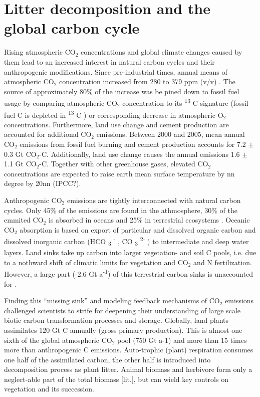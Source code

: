 \section{Litter decomposition and the global carbon cycle}

Rising atmospheric CO$_{2}$ concentrations and global climate changes caused by them \citep{IPCC2007pt1ch1} lead to an increased interest in natural carbon cycles and their anthropogenic modifications. Since pre-industrial times, annual means of atmospheric CO$_{2}$ concentration increased from 280 to 379 ppm (v/v) \citep{IPCC2007pt1ch1}. The source of approximately 80\% of the increase was be pined down to fossil fuel usage by comparing atmospheric CO$_{2}$ concentration to its \textsuperscript{13} C signature (fossil fuel C is depleted in \textsuperscript{13} C ) or corresponding decrease in atmospheric O$_{2}$ concentrations\citep{IPCC2007pt1ch1}. Furthermore, land use change and cement production are accounted for additional CO$_{2}$ emissions. Between 2000 and 2005, mean annual CO$_{2}$ emissions from fossil fuel burning and cement production accounts for 7.2 $\pm$ 0.3 Gt CO$_{2}$-C. Additionally, land use change causes the annual emissions 1.6 $\pm$ 1.1 Gt CO$_{2}$-C. Together with other greenhouse gases, elevated CO$_{2}$ concentrations are expected to raise earth mean surface temperature by nn degree by 20nn (IPCC?).

Anthropogenic CO$_{2}$ emissions are tightly interconnected with natural carbon cycles. Only 45\% of the emissions are found in the athmosphere, 30\% of the emmited CO$_{2}$ is absorbed in oceans and 25\% in terrestrial ecosystems . Oceanic CO$_{2}$ absorption is based on export of particular and dissolved organic carbon and dissolved inorganic carbon (HCO \textsubscript{3} \textsuperscript{-} , CO \textsubscript{3} \textsuperscript{2-} ) to intermediate and deep water layers. Land sinks take up carbon into larger vegetation- and soil C pools, i.e. due to a nothward shift of climatic limits for vegetation and CO$_{2}$ and N fertilization. However, a large part (-2.6 Gt a\textsuperscript{-1}) of this terrestrial carbon sinks is unaccounted for \citep[p. 515]{IPCC2007pt1ch7}. 

Finding this ``missing sink'' and modeling feedback mechanisms of CO$_{2}$ emissions challenged scientists to strife for deepening their understanding of large scale biotic carbon transformation processes and storage. Globally, land plants assimilates 120 Gt C annually (gross primary production). This is almost one sixth of the global atmospheric CO$_{2}$ pool (750 Gt a-1) and more than 15 times more than anthropogenic C emissions. Auto-trophic (plant) respiration consumes one half of the assimilated carbon, the other half is introduced into decomposition process as plant litter. Animal biomass and herbivore form only a neglect-able part of the total biomass [lit.], but can wield key controls on vegetation and its succession.

